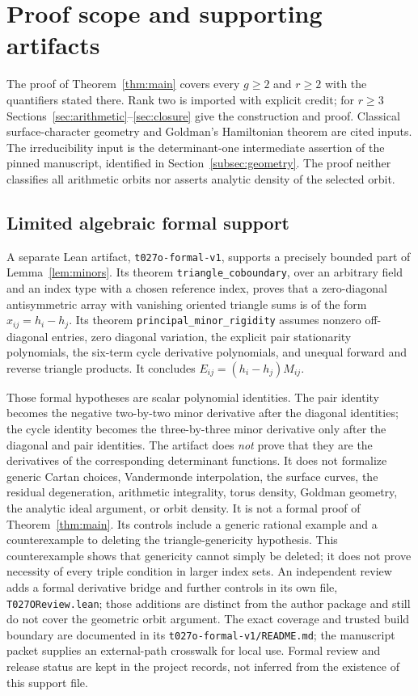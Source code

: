\appendix
\section{Proof scope and supporting artifacts}\label{sec:scope}
The proof of Theorem~\ref{thm:main} covers every $g\geq2$ and $r\geq2$
with the quantifiers stated there. Rank two is imported with explicit
credit; for $r\geq3$ Sections~\ref{sec:arithmetic}--\ref{sec:closure}
give the construction and proof. Classical surface-character geometry and
Goldman's Hamiltonian theorem are cited inputs. The irreducibility input
is the determinant-one intermediate assertion of the pinned manuscript,
identified in Section~\ref{subsec:geometry}. The proof neither classifies
all arithmetic orbits nor asserts analytic density of the selected orbit.

\subsection{Limited algebraic formal support}
A separate Lean artifact, \texttt{t027o-formal-v1}, supports a precisely
bounded part of Lemma~\ref{lem:minors}. Its theorem
\texttt{triangle\_coboundary}, over an arbitrary field and an index type
with a chosen reference index, proves that a zero-diagonal antisymmetric
array with vanishing oriented triangle sums is of the form
$x_{ij}=h_i-h_j$. Its theorem \texttt{principal\_minor\_rigidity} assumes
nonzero off-diagonal entries, zero diagonal variation, the explicit pair
stationarity polynomials, the six-term cycle derivative polynomials, and
unequal forward and reverse triangle products. It concludes
$E_{ij}=(h_i-h_j)M_{ij}$.

Those formal hypotheses are scalar polynomial identities. The pair identity
becomes the negative two-by-two minor derivative after the diagonal
identities; the cycle identity becomes the three-by-three minor derivative
only after the diagonal and pair identities. The artifact
does \emph{not} prove that they are the derivatives of the corresponding
determinant functions. It does not formalize generic Cartan choices,
Vandermonde interpolation, the surface curves, the residual degeneration,
arithmetic integrality, torus density, Goldman geometry, the analytic
ideal argument, or orbit density. It is not a formal proof of
Theorem~\ref{thm:main}. Its controls include a generic rational example
and a counterexample to deleting the triangle-genericity hypothesis.
This counterexample shows that genericity cannot simply be deleted; it does
not prove necessity of every triple condition in larger index sets. An
independent review adds a formal derivative bridge and further controls in
its own file, \texttt{T027OReview.lean}; those additions are distinct from
the author package and still do not cover the geometric orbit argument.
The exact coverage and trusted build boundary are documented in its
\texttt{t027o-formal-v1/README.md};
the manuscript packet supplies an external-path crosswalk for local use.
Formal review and release status are kept in the project records, not
inferred from the existence of this support file.

